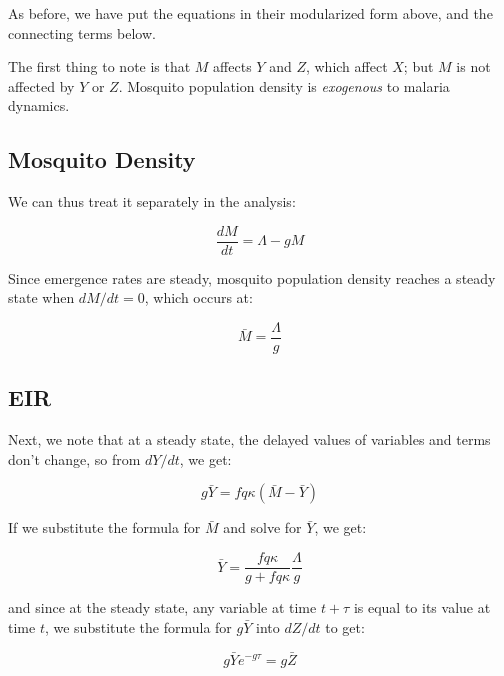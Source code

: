 \documentclass[
]{book}
\begin{document}
As before, we have put the equations in their modularized form above, and the connecting terms below.

The first thing to note is that \(M\) affects \(Y\) and \(Z\), which affect \(X\); but \(M\) is not affected by \(Y\) or \(Z\). Mosquito population density is \emph{exogenous} to malaria dynamics.

\hypertarget{mosquito-density}{%
\subsection{Mosquito Density}\label{mosquito-density}}

We can thus treat it separately in the analysis:

\begin{equation}
\frac{dM}{dt} = \Lambda - g M 
\end{equation}

Since emergence rates are steady, mosquito population density reaches a steady state when \(dM/dt=0\), which occurs at:

\begin{equation}
\bar M = \frac{\Lambda}{g} 
\end{equation}

\hypertarget{eir}{%
\subsection{EIR}\label{eir}}

Next, we note that at a steady state, the delayed values of variables and terms don't change, so from \(dY/dt\), we get:

\begin{equation}
g \bar Y = fq\kappa(\bar M- \bar Y) 
\end{equation}

If we substitute the formula for \(\bar M\) and solve for \(\bar Y\), we get:

\begin{equation}
\bar Y = \frac{fq\kappa}{g + fq\kappa} \frac{\Lambda}{g}
\end{equation}

and since at the steady state, any variable at time \(t+\tau\) is equal to its value at time \(t\), we substitute the formula for \(g \bar Y\) into \(dZ/dt\) to get:

\begin{equation}
g \bar Y e^{-g\tau} = g \bar Z
\end{equation}
\end{document}

